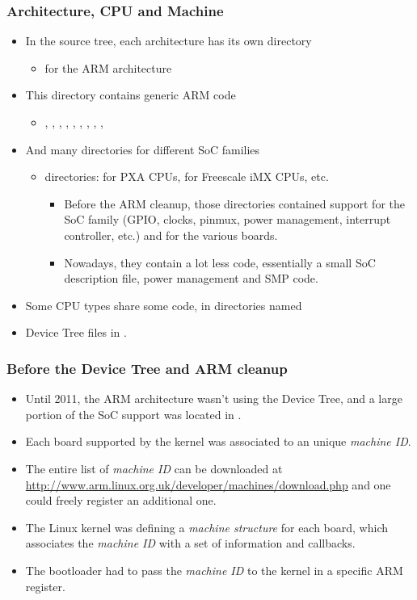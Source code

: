 \begin{frame}
  \frametitle{Architecture, CPU and Machine}
  \begin{itemize}
  \item In the source tree, each architecture has its own directory
    \begin{itemize}
    \item {} for the ARM architecture
    \end{itemize}
  \item This directory contains generic ARM code
    \begin{itemize}
    \item {}, , , ,
      , , , ,
      , 
    \end{itemize}
  \item And many directories for different SoC families
    \begin{itemize}
    \item {} directories:  for PXA CPUs,
       for Freescale iMX CPUs, etc.
      \begin{itemize}
      \item Before the ARM cleanup, those directories contained
        support for the SoC family (GPIO, clocks, pinmux, power
        management, interrupt controller, etc.) and for the various
        boards.
      \item Nowadays, they contain a lot less code, essentially a
        small SoC description file, power management and SMP code.
      \end{itemize}
    \end{itemize}
  \item Some CPU types share some code, in directories named
  \item Device Tree files in .
  \end{itemize}
\end{frame}

\begin{frame}
  \frametitle{Before the Device Tree and ARM cleanup}
  \begin{itemize}
  \item Until 2011, the ARM architecture wasn't using the Device Tree,
    and a large portion of the SoC support was located in
    .
  \item Each board supported by the kernel was associated to an unique
    {\em machine ID}.
  \item The entire list of {\em machine ID} can be downloaded at
    \url{http://www.arm.linux.org.uk/developer/machines/download.php}
    and one could freely register an additional one.
  \item The Linux kernel was defining a {\em machine structure} for
    each board, which associates the {\em machine ID} with a set of
    information and callbacks.
  \item The bootloader had to pass the {\em machine ID} to the kernel
    in a specific ARM register.
  \end{itemize}
\end{frame}

